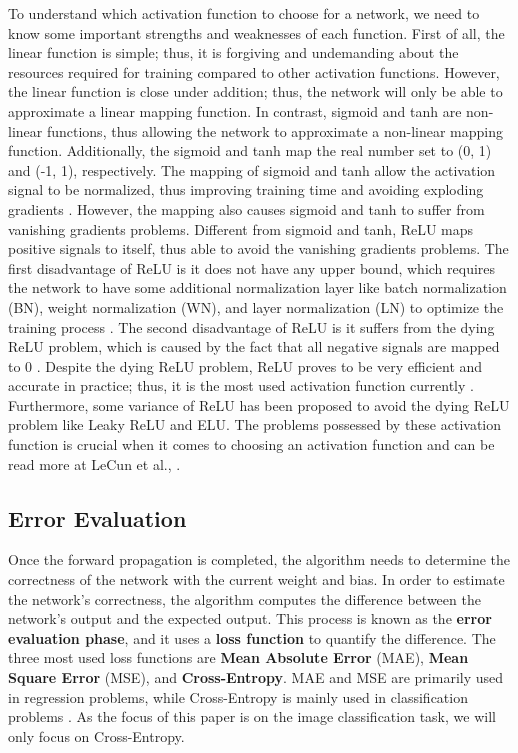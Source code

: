 To understand which activation function to choose for a network, we need to know some important strengths and weaknesses of each function. First of all, the linear function is simple; thus, it is forgiving and undemanding about the resources required for training compared to other activation functions. However, the linear function is close under addition; thus, the network will only be able to approximate a linear mapping function. In contrast, sigmoid and tanh are non-linear functions, thus allowing the network to approximate a non-linear mapping function. Additionally, the sigmoid and tanh map the real number set to (0, 1) and (-1, 1), respectively. The mapping of sigmoid and tanh allow the activation signal to be normalized, thus improving training time and avoiding exploding gradients \cite{lecun2015deep}. However, the mapping also causes sigmoid and tanh to suffer from vanishing gradients problems. Different from sigmoid and tanh, ReLU maps positive signals to itself, thus able to avoid the vanishing gradients problems. The first disadvantage of ReLU is it does not have any upper bound, which requires the network to have some additional normalization layer like batch normalization (BN), weight normalization (WN), and layer normalization (LN) to optimize the training process \cite{relu_optimization_2020}. The second disadvantage of ReLU is it suffers from the dying ReLU problem, which is caused by the fact that all negative signals are mapped to 0 \cite{dying_relu}. Despite the dying ReLU problem, ReLU proves to be very efficient and accurate in practice; thus, it is the most used activation function currently \cite{li2021survey}. Furthermore, some variance of ReLU has been proposed to avoid the dying ReLU problem like Leaky ReLU and ELU. The problems possessed by these activation function is crucial when it comes to choosing an activation function and can be read more at LeCun et al., \cite{lecun2015deep}.

\subsection{Error Evaluation}
Once the forward propagation is completed, the algorithm needs to determine the correctness of the network with the current weight and bias. In order to estimate the network's correctness, the algorithm computes the difference between the network's output and the expected output. This process is known as the \textbf{error evaluation phase}, and it uses a \textbf{loss function} to quantify the difference. The three most used loss functions are \textbf{Mean Absolute Error} (MAE), \textbf{Mean Square Error} (MSE), and \textbf{Cross-Entropy}. MAE and MSE are primarily used in regression problems, while Cross-Entropy is mainly used in classification problems \cite{li2021survey}. As the focus of this paper is on the image classification task, we will only focus on Cross-Entropy.

